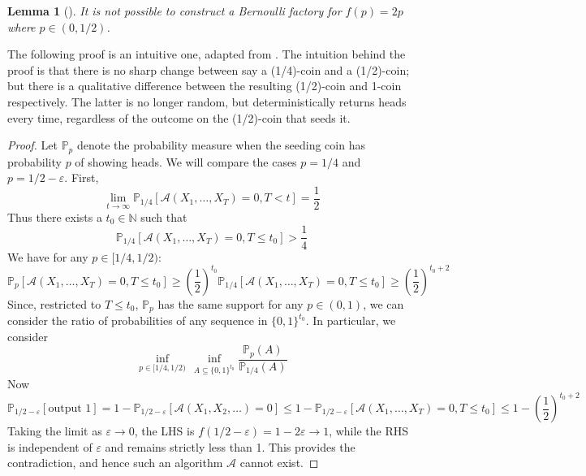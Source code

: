 \documentclass{article}
\newtheorem{lemma}{Lemma}
\theoremstyle{definition}
\newcommand{\PR}{\mathbb{P}}
\newcommand{\A}{\mathcal{A}}
\begin{document}
\begin{lemma}[{\citet[Corollary 3.3]{latuszynski2011}}]\label{thm:no_2p_bf}
It is not possible to construct a Bernoulli factory for $f(p)=2p$ where $p\in(0,1/2)$.
\end{lemma}
The following proof is an intuitive one, adapted from \citet{latuszynski2011}.
The intuition behind the proof is that there is no sharp change between say a (1/4)-coin and a (1/2)-coin; but there is a qualitative difference between the resulting (1/2)-coin and 1-coin respectively. The latter is no longer random, but deterministically returns heads every time, regardless of the outcome on the (1/2)-coin that seeds it.
\begin{proof}
Let $\PR_{p}$ denote the probability measure when the seeding coin has probability $p$ of showing heads. We will compare the cases $p=1/4$ and $p=1/2 - \varepsilon$.
First, 
\begin{equation*}
\lim_{t\to\infty} \PR_{1/4} [\A(X_1,\dots,X_T)=0, T<t] = \frac{1}{2}
\end{equation*}
Thus there exists a $t_0 \in \mathbb{N}$ such that 
\begin{equation*}
\PR_{1/4} [\A(X_1,\dots,X_T)=0, T\leq t_0] > \frac{1}{4}
\end{equation*}
We have for any $p \in [1/4, 1/2)$:
\begin{equation*}
\PR_{p} [\A(X_1,\dots,X_T)=0, T\leq t_0] \geq \left(\frac{1}{2}\right)^{t_0} \PR_{1/4} [\A(X_1,\dots,X_T)=0, T\leq t_0] \geq \left(\frac{1}{2}\right)^{t_0+2}
\end{equation*}
Since, restricted to $T\leq t_0$, $\PR_p$ has the same support for any $p \in (0,1)$, we can consider the ratio of probabilities of any sequence in $\{0,1\}^{t_0}$. In particular, we consider 
\begin{equation*}
\inf_{p\in[1/4,1/2)}\, \inf_{A\subseteq\{0,1\}^{t_0}} \frac{\PR_{p}(A)}{\PR_{1/4}(A)}
\end{equation*}
Now
\begin{equation*}
\PR_{1/2 - \varepsilon} [\text{output } 1] = 1-\PR_{1/2 - \varepsilon} [\A(X_1,X_2,\dots)=0]  \leq 1- \PR_{1/2 - \varepsilon} [\A(X_1,\dots,X_T)=0, T\leq t_0] \leq 1- \left(\frac{1}{2}\right)^{t_0+2}
\end{equation*}
Taking the limit as $\varepsilon\to 0$, the LHS is $f(1/2 - \varepsilon) = 1-2\varepsilon \rightarrow 1$, while the RHS is independent of $\varepsilon$ and remains strictly less than 1. This provides the contradiction, and hence such an algorithm $\A$ cannot exist.
\end{proof}
\end{document}
